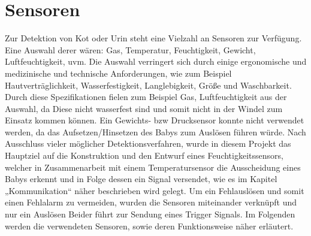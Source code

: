 \section{Sensoren}
\label{sec:sensor}

Zur Detektion von Kot oder Urin steht eine Vielzahl an Sensoren zur
Verfügung. Eine Auswahl derer wären: Gas, Temperatur, Feuchtigkeit,
Gewicht, Luftfeuchtigkeit, uvm. Die Auswahl verringert sich durch
einige ergonomische und medizinische und technische Anforderungen, wie
zum Beispiel Hautverträglichkeit, Wasserfestigkeit, Langlebigkeit,
Größe und Waschbarkeit. Durch diese Spezifikationen fielen zum
Beispiel Gas, Luftfeuchtigkeit aus der Auswahl, da Diese nicht
wasserfest sind und somit nicht in der Windel zum Einsatz kommen
können. Ein Gewichts- bzw Drucksensor  konnte nicht verwendet werden,
da das Aufsetzen/Hinsetzen des Babys zum Auslösen führen würde.
Nach Ausschluss vieler möglicher Detektionsverfahren, wurde in diesem
Projekt das Hauptziel auf die Konstruktion und den Entwurf eines
Feuchtigkeitssensors, welcher in Zusammenarbeit mit einem
Temperatursensor die Ausscheidung eines Babys erkennt und in Folge
dessen ein Signal versendet, wie es im Kapitel „Kommunikation“ näher
beschrieben wird gelegt. Um ein Fehlauslösen und somit einen Fehlalarm
zu vermeiden, wurden die Sensoren miteinander verknüpft und nur ein
Auslösen Beider führt zur Sendung eines Trigger Signals.
Im Folgenden werden die verwendeten Sensoren, sowie deren
Funktionsweise näher erläutert.


